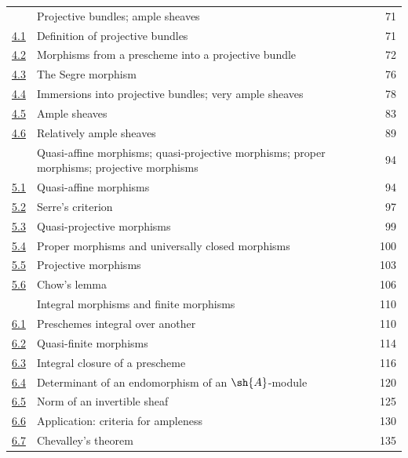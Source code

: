 \begin{longtable}{@{}p{}p{}r@{}}
\hyperref[section:II.4]{\textsection4} & Projective bundles; ample sheaves & 71\\
\hyperref[subsection:II.4.1]{4.1} & Definition of projective bundles & 71\\
\hyperref[subsection:II.4.2]{4.2} & Morphisms from a prescheme into a projective bundle & 72\\
\hyperref[subsection:II.4.3]{4.3} & The Segre morphism & 76\\
\hyperref[subsection:II.4.4]{4.4} & Immersions into projective bundles; very ample sheaves & 78\\
\hyperref[subsection:II.4.5]{4.5} & Ample sheaves & 83\\
\hyperref[subsection:II.4.6]{4.6} & Relatively ample sheaves & 89\\
\hyperref[section:II.5]{\textsection5} & Quasi-affine morphisms; quasi-projective morphisms;
proper morphisms; projective morphisms & 94\\
\hyperref[subsection:II.5.1]{5.1} & Quasi-affine morphisms & 94\\
\hyperref[subsection:II.5.2]{5.2} & Serre's criterion & 97\\
\hyperref[subsection:II.5.3]{5.3} & Quasi-projective morphisms & 99\\
\hyperref[subsection:II.5.4]{5.4} & Proper morphisms and universally closed morphisms & 100\\
\hyperref[subsection:II.5.5]{5.5} & Projective morphisms & 103\\
\hyperref[subsection:II.5.6]{5.6} & Chow's lemma & 106\\
\hyperref[section:II.6]{\textsection6} & Integral morphisms and finite morphisms & 110\\
\hyperref[subsection:II.6.1]{6.1} & Preschemes integral over another & 110\\
\hyperref[subsection:II.6.2]{6.2} & Quasi-finite morphisms & 114\\
\hyperref[subsection:II.6.3]{6.3} & Integral closure of a prescheme & 116\\
\hyperref[subsection:II.6.4]{6.4} & Determinant of an endomorphism of an $\sh{A}$-module & 120\\
\hyperref[subsection:II.6.5]{6.5} & Norm of an invertible sheaf & 125\\
\hyperref[subsection:II.6.6]{6.6} & Application: criteria for ampleness & 130\\
\hyperref[subsection:II.6.7]{6.7} & Chevalley's theorem & 135\\

\end{longtable}
